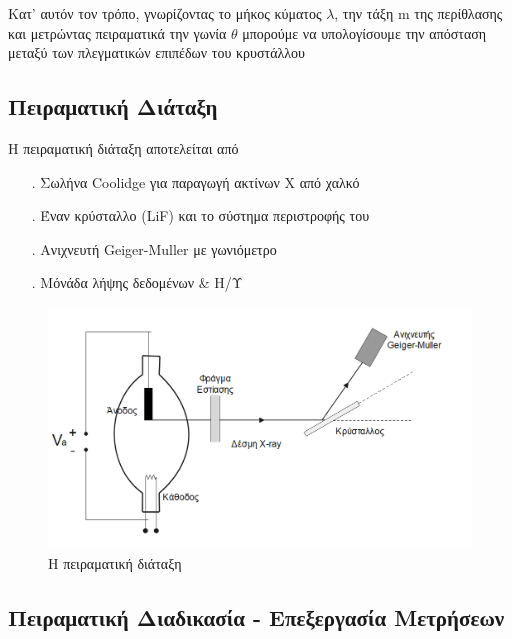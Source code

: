 \documentclass[a4paper]{article}
\begin{document}
Κατ' αυτόν τον τρόπο, γνωρίζοντας το μήκος κύματος $\lambda$, την τάξη m της περίθλασης και μετρώντας πειραματικά την γωνία $\theta$ μπορούμε να υπολογίσουμε την απόσταση μεταξύ των πλεγματικών επιπέδων του κρυστάλλου

	
\subsection*{Πειραματική Διάταξη}
Η πειραματική διάταξη αποτελείται από 
\begin{itemize}
	\item[.] Σωλήνα Coolidge για παραγωγή ακτίνων Χ από χαλκό
	\item[.] Έναν κρύσταλλο (LiF) και το σύστημα περιστροφής του
	\item[.] Ανιχνευτή Geiger-Muller με γωνιόμετρο
	\item[.] Μόνάδα λήψης δεδομένων \& Η/Υ
\end{itemize}

\begin{figure}[h!]
	\centering
	\includegraphics[scale=0.3]{setup.png}
	\caption{ Η πειραματική διάταξη}
\end{figure}
\subsection*{Πειραματική Διαδικασία - Επεξεργασία Μετρήσεων}
\end{document}
